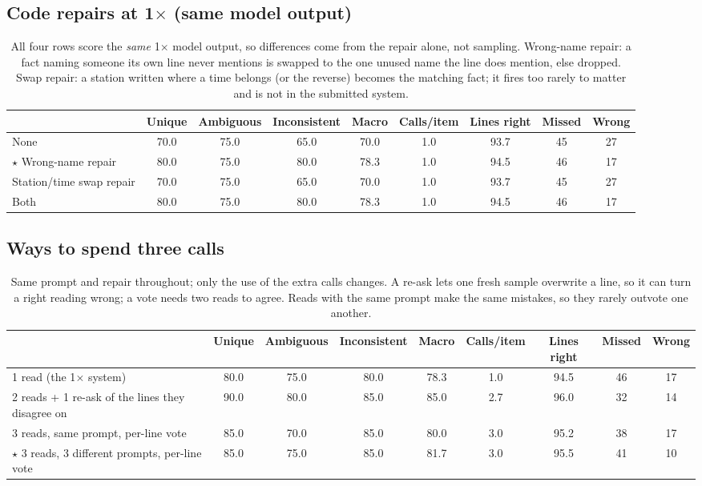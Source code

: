 \documentclass[10pt]{article}
\begin{document}
\subsection*{Code repairs at 1$\times$ (same model output)}
\begin{table}[H]
\centering\footnotesize\setlength{\tabcolsep}{3.5pt}\renewcommand{\arraystretch}{1.08}
\begin{tabular}{@{}p{5.4cm} ccc c c ccc@{}}
\toprule
 & Unique & Ambiguous & Inconsistent & \textbf{Macro} & Calls/item & Lines right & Missed & Wrong \\
\midrule
None & 70.0 & 75.0 & 65.0 & 70.0 & 1.0 & 93.7 & 45 & 27 \\
$\star$ Wrong-name repair & 80.0 & 75.0 & 80.0 & 78.3 & 1.0 & 94.5 & 46 & 17 \\
Station/time swap repair & 70.0 & 75.0 & 65.0 & 70.0 & 1.0 & 93.7 & 45 & 27 \\
Both & 80.0 & 75.0 & 80.0 & 78.3 & 1.0 & 94.5 & 46 & 17 \\
\bottomrule
\end{tabular}
\caption{All four rows score the \emph{same} 1$\times$ model output, so differences come from the repair alone, not sampling. Wrong-name repair: a fact naming someone its own line never mentions is swapped to the one unused name the line does mention, else dropped. Swap repair: a station written where a time belongs (or the reverse) becomes the matching fact; it fires too rarely to matter and is not in the submitted system.}
\end{table}

\subsection*{Ways to spend three calls}
\begin{table}[H]
\centering\footnotesize\setlength{\tabcolsep}{3.5pt}\renewcommand{\arraystretch}{1.08}
\begin{tabular}{@{}p{5.4cm} ccc c c ccc@{}}
\toprule
 & Unique & Ambiguous & Inconsistent & \textbf{Macro} & Calls/item & Lines right & Missed & Wrong \\
\midrule
1 read (the 1$\times$ system) & 80.0 & 75.0 & 80.0 & 78.3 & 1.0 & 94.5 & 46 & 17 \\
2 reads + 1 re-ask of the lines they disagree on & 90.0 & 80.0 & 85.0 & 85.0 & 2.7 & 96.0 & 32 & 14 \\
3 reads, same prompt, per-line vote & 85.0 & 70.0 & 85.0 & 80.0 & 3.0 & 95.2 & 38 & 17 \\
$\star$ 3 reads, 3 different prompts, per-line vote & 85.0 & 75.0 & 85.0 & 81.7 & 3.0 & 95.5 & 41 & 10 \\
\bottomrule
\end{tabular}
\caption{Same prompt and repair throughout; only the use of the extra calls changes. A re-ask lets one fresh sample overwrite a line, so it can turn a right reading wrong; a vote needs two reads to agree. Reads with the same prompt make the same mistakes, so they rarely outvote one another.}
\end{table}
\end{document}
